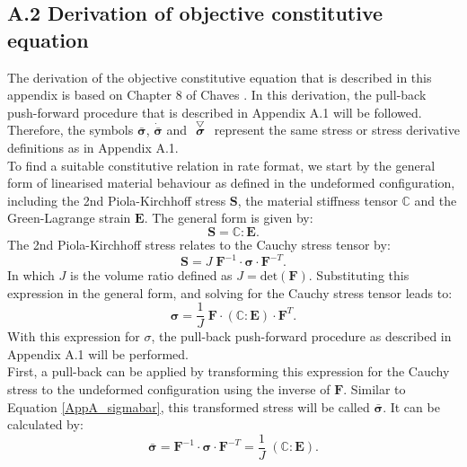 \subsection*{A.2 Derivation of objective constitutive equation}
%
The derivation of the objective constitutive equation that is described in this appendix is based on Chapter 8 of Chaves \cite{chaves}. In this derivation, the pull-back push-forward procedure that is described in Appendix A.1 will be followed. Therefore, the symbols $\bar{\boldsymbol{\sigma}}$, $\dot{\bar{\boldsymbol{\sigma}}}$ and $\acctriang{\boldsymbol{\sigma}}$ represent the same stress or stress derivative definitions as in Appendix A.1.\\
\newline
To find a suitable constitutive relation in rate format, we start by the general form of linearised material behaviour as defined in the undeformed configuration, including the 2nd Piola-Kirchhoff stress $\boldsymbol{S}$, the material stiffness tensor $\boldsymbol{\mathbb C}$ and the Green-Lagrange strain $\boldsymbol{E}$. The general form is given by:
\begin{equation}\label{AppA_PK}
\boldsymbol{S} = \boldsymbol{\mathbb C}:\boldsymbol{E}.
\end{equation}
The 2nd Piola-Kirchhoff stress relates to the Cauchy stress tensor by:
\begin{equation}
\boldsymbol{S} = J\;\boldsymbol{F}^{-1}\cdot\boldsymbol{\sigma}\cdot\boldsymbol{F}^{-T}.
\end{equation}
In which $J$ is the volume ratio defined as $J=\text{det}(\boldsymbol{F})$.         Substituting this expression in the general form, and solving for the Cauchy stress tensor leads to:
\begin{equation}\label{AppA_cauchy}
\boldsymbol{\sigma} = \frac{1}{J}\;\boldsymbol{F}\cdot(\boldsymbol{\mathbb C}:\boldsymbol{E})\cdot\boldsymbol{F}^T.
\end{equation}
With this expression for $\sigma$, the pull-back push-forward procedure as described in Appendix A.1 will be performed.\\
First, a pull-back can be applied by transforming this expression for the Cauchy stress to the undeformed configuration using the inverse of $\boldsymbol{F}$. Similar to Equation \ref{AppA_sigmabar}, this transformed stress will be called $\bar{\boldsymbol{\sigma}}$. It can be calculated by:
\begin{equation}
\bar{\boldsymbol{\sigma}} = \boldsymbol{F}^{-1}\cdot\boldsymbol{\sigma}\cdot\boldsymbol{F}^{-T} = \frac{1}{J}\;(\boldsymbol{\mathbb C}:\boldsymbol{E}).
\end{equation}
